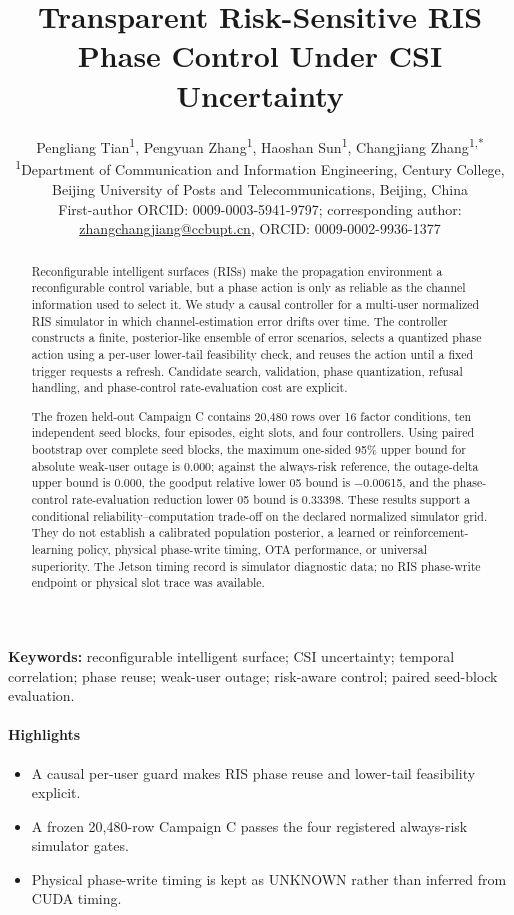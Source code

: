 \documentclass[10pt,twocolumn]{article}
\title{Transparent Risk-Sensitive RIS Phase Control Under CSI Uncertainty}
\author{%
\begin{tabular}{c}
Pengliang Tian\textsuperscript{1}, Pengyuan Zhang\textsuperscript{1}, Haoshan Sun\textsuperscript{1}, Changjiang Zhang\textsuperscript{1,*}\\[0.35ex]
\parbox{0.95\textwidth}{\centering\footnotesize \textsuperscript{1}Department of Communication and Information Engineering, Century College, Beijing University of Posts and Telecommunications, Beijing, China}\\[0.35ex]
\footnotesize First-author ORCID: 0009-0003-5941-9797; corresponding author: \href{mailto:zhangchangjiang@ccbupt.cn}{zhangchangjiang@ccbupt.cn}, ORCID: 0009-0002-9936-1377
\end{tabular}
}
\date{}
\providecommand{\tightlist}{\setlength{\itemsep}{0pt}\setlength{\parskip}{0pt}}
\begin{document}
\maketitle
\begin{abstract}

Reconfigurable intelligent surfaces (RISs) make the propagation
environment a reconfigurable control variable, but a phase action is
only as reliable as the channel information used to select it. We study
a causal controller for a multi-user normalized RIS simulator in which
channel-estimation error drifts over time. The controller constructs a
finite, posterior-like ensemble of error scenarios, selects a quantized
phase action using a per-user lower-tail feasibility check, and reuses
the action until a fixed trigger requests a refresh. Candidate search,
validation, phase quantization, refusal handling, and phase-control
rate-evaluation cost are explicit.

The frozen held-out Campaign C contains 20,480 rows over 16 factor
conditions, ten independent seed blocks, four episodes, eight slots, and
four controllers. Using paired bootstrap over complete seed blocks, the
maximum one-sided 95\% upper bound for absolute weak-user outage is
0.000; against the always-risk reference, the outage-delta upper bound
is 0.000, the goodput relative lower 05 bound is −0.00615, and the
phase-control rate-evaluation reduction lower 05 bound is 0.33398. These
results support a conditional reliability--computation trade-off on the
declared normalized simulator grid. They do not establish a calibrated
population posterior, a learned or reinforcement-learning policy,
physical phase-write timing, OTA performance, or universal superiority.
The Jetson timing record is simulator diagnostic data; no RIS
phase-write endpoint or physical slot trace was available.

\end{abstract}

\textbf{Keywords:} reconfigurable intelligent surface; CSI uncertainty;
temporal correlation; phase reuse; weak-user outage; risk-aware control;
paired seed-block evaluation.

\paragraph{Highlights}

\begin{itemize}
\tightlist
\item
  A causal per-user guard makes RIS phase reuse and lower-tail
  feasibility explicit.
\item
  A frozen 20,480-row Campaign C passes the four registered always-risk
  simulator gates.
\item
  Physical phase-write timing is kept as UNKNOWN rather than inferred
  from CUDA timing.
\end{itemize}
\end{document}
